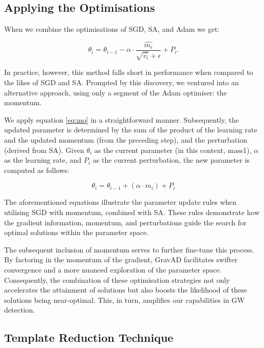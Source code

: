 \documentclass[twocolumn, aps, pra]{revtex4-2}
\begin{document}
	\subsection{Applying the Optimisations}
	
	When we combine the optimisations of SGD, SA, and Adam we get:
	
	\begin{equation}
		\theta_i = \theta_{i-1} - \alpha \cdot \frac{\hat{m_i}}{\sqrt{\hat{v_i}} + \epsilon}  + P_i .
	\end{equation}
	
	In practice, however, this method falls short in performance when compared to the likes of SGD and SA. Prompted by this discovery, we ventured into an alternative approach, using only a segment of the Adam optimiser: the momentum.
	
	We apply equation \ref{eq:mo} in a straightforward manner. Subsequently, the updated parameter is determined by the sum of the product of the learning rate and the updated momentum (from the preceding step), and the perturbation (derived from SA). Given $\theta_i$ as the current parameter (in this context, mass1), $\alpha$ as the learning rate, and $P_i$ as the current perturbation, the new parameter is computed as follows:
	
	\begin{equation}
		\theta_i = \theta_{i-1} + \left(\alpha \cdot m_i\right) + P_i
	\end{equation}
	
	The aforementioned equations illustrate the parameter update rules when utilising SGD with momentum, combined with SA. These rules demonstrate how the gradient information, momentum, and perturbations guide the search for optimal solutions within the parameter space.
	
	The subsequent inclusion of momentum serves to further fine-tune this process. By factoring in the momentum of the gradient, GravAD facilitates swifter convergence and a more nuanced exploration of the parameter space. Consequently, the combination of these optimisation strategies not only accelerates the attainment of solutions but also boosts the likelihood of these solutions being near-optimal. This, in turn, amplifies our capabilities in GW detection.
	
	\subsection{Template Reduction Technique}
	
\end{document}
